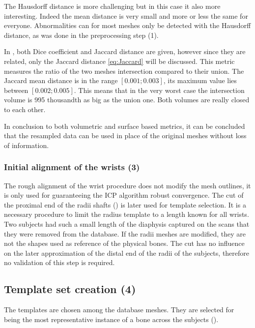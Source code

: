 The Hausdorff distance is more challenging but in this case it also more interesting. Indeed the mean distance is very small and more or less the same for everyone. Abnormalities can for most meshes only be detected with the Hausdorff distance, as was done in the preprocessing step (1). 

In , both Dice coefficient and Jaccard distance are given, however since they are related, only the Jaccard distance \eqref{eq:Jaccard} will be discussed. This metric measures the ratio of the two meshes intersection compared to their union. The Jaccard mean distance is in the range $[0.001;0.003]$, its maximum value lies between $[0.002; 0.005]$. This means that in the very worst case the intersection volume is 995 thousandth as big as the union one. Both volumes are really closed to each other. 

In conclusion to both volumetric and surface based metrics, it can be concluded that the resampled data \md* can be used in place of the original meshes \mo* without loss of information.


\subsubsection{Initial alignment of the wrists (3)}
\label{ssubsec:rough_ali_validation}

The rough alignment of the wrist procedure does not modify the mesh outlines, it is only used for guaranteeing the ICP algorithm robust convergence. The cut of the proximal end of the radii shafts () is later used for template selection. It is a necessary procedure to limit the radius template to a length known for all wrists. Two subjects had such a small length of the diaphysis captured on the scans that they were removed from the database. If the radii meshes are modified, they are not the shapes used as reference of the physical bones. The cut has no influence on the later approximation of the distal end of the radii of the subjects, therefore no validation of this step is required. 


\subsection{Template set creation (4)}
\label{ssubsec:templates_set_creation}

The templates are chosen among the database meshes. They are selected for being the most representative instance of a bone across the subjects (). 

